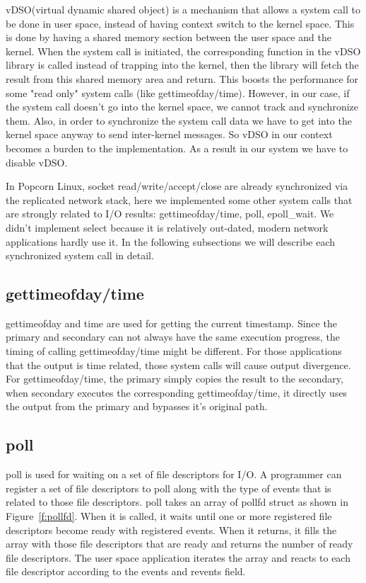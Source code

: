vDSO(virtual dynamic shared object) is a mechanism that allows a system call to be done in user space, instead of having context switch to the kernel space. This is done by having a shared memory section between the user space and the kernel. When the system call is initiated, the corresponding function in the vDSO library is called instead of trapping into the kernel, then the library will fetch the result from this shared memory area and return. This boosts the performance for some "read only" system calls (like gettimeofday/time). However, in our case, if the system call doesn't go into the kernel space, we cannot track and synchronize them. Also, in order to synchronize the system call data we have to get into the kernel space anyway to send inter-kernel messages. So vDSO in our context becomes a burden to the implementation. As a result in our system we have to disable vDSO.

In Popcorn Linux, socket read/write/accept/close are already synchronized via the replicated network stack, here we implemented some other system calls that are strongly related to I/O results: gettimeofday/time, poll, epoll\_wait. We didn't implement select because it is relatively out-dated, modern network applications hardly use it. In the following subsections we will describe each synchronized system call in detail.

\subsection{gettimeofday/time}

gettimeofday and time are used for getting the current timestamp. Since the primary and secondary can not always have the same execution progress, the timing of calling gettimeofday/time might be different. For those applications that the output is time related, those system calls will cause output divergence. For gettimeofday/time, the primary simply copies the result to the secondary, when secondary executes the corresponding gettimeofday/time, it directly uses the output from the primary and bypasses it's original path.

\subsection{poll}

poll is used for waiting on a set of file descriptors for I/O. A programmer can register a set of file descriptors to poll along with the type of events that is related to those file descriptors. poll takes an array of pollfd struct as shown in Figure~\ref{f:pollfd}. When it is called, it waits until one or more registered file descriptors become ready with registered events. When it returns, it fills the array with those file descriptors that are ready and returns the number of ready file descriptors. The user space application iterates the array and reacts to each file descriptor according to the events and revents field.

